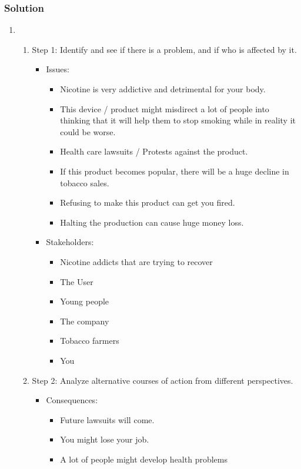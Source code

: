 \documentclass[a4paper, 10pt]{article}
\begin{document}
			\subsubsection{Solution}
				\begin{enumerate}
					\item \\
						\begin{enumerate}
							\item Step 1: Identify and see if there is a problem, and if who is affected by it. \\
							\begin{itemize}
								\item Issues:
								\begin{itemize}
									\item Nicotine is very addictive and detrimental for your body.
									\item This device / product might misdirect a lot of people into thinking that it will help them to stop smoking while in reality it could be worse.
									\item Health care lawsuits / Protests against the product.
									\item If this product becomes popular, there will be a huge decline in tobacco sales.
									\item Refusing to make this product can get you fired.
									\item Halting the production can cause huge money loss.
								\end{itemize}
							
								\item Stakeholders:
								\begin{itemize}
									\item Nicotine addicts that are trying to recover
									\item The User
									\item Young people
									\item The company
									\item Tobacco farmers
									\item You
								\end{itemize}
							\end{itemize}
						
							\item Step 2: Analyze alternative courses of action from different perspectives.
							\begin{itemize}
								\item Consequences:
								\begin{itemize}
									\item Future lawsuits will come.
									\item You might lose your job.
									\item A lot of people might develop health problems
								\end{itemize}
							

\end{itemize}
\end{enumerate}
\end{enumerate}
\end{document}
